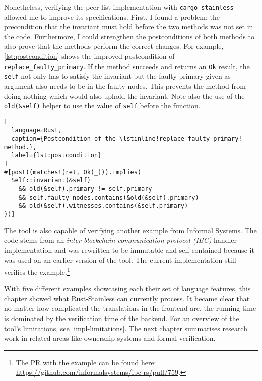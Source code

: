 Nonetheless, verifying the peer-list implementation with
\passthrough{\lstinline!cargo stainless!} allowed me to improve its
specifications. First, I found a problem: the precondition that the invariant
must hold before the two methods was not set in the code. Furthermore, I could
strengthen the postconditions of both methods to also prove that the methods
perform the correct changes. For example, \autoref{lst:postcondition} shows the
improved postcondition of \lstinline!replace_faulty_primary!. If the method
succeeds and returns an \lstinline!Ok! result, the \lstinline!self! not only has
to satisfy the invariant but the faulty primary given as argument also needs to
be in the faulty nodes. This prevents the method from doing nothing which would
also uphold the invariant. Note also the use of the \lstinline!old(&self)!
helper to use the value of \lstinline!self! before the function.

\begin{lstlisting}[
  language=Rust,
  caption={Postcondition of the \lstinline!replace_faulty_primary! method.},
  label={lst:postcondition}
]
#[post((matches!(ret, Ok(_))).implies(
  Self::invariant(&self)
    && old(&self).primary != self.primary
    && self.faulty_nodes.contains(&old(&self).primary)
    && old(&self).witnesses.contains(&self.primary)
))]
\end{lstlisting}

The tool is also capable of verifying another example from Informal Systems. The
code stems from an \emph{inter-blockchain communication protocol (IBC)} handler
implementation and was rewritten to be immutable and self-contained because it
was used on an earlier version of the tool. The current implementation still
verifies the example.\footnote{The PR with the example can be found here:
\url{https://github.com/informalsystems/ibc-rs/pull/759}.}

\hfill \break \noindent With five different examples showcasing each their set
of language features, this chapter showed what Rust-Stainless can currently
process. It became clear that no matter how complicated the translations in the
frontend are, the running time is dominated by the verification time of the
backend. For an overview of the tool's limitations, see
\autoref{impl-limitations}. The next chapter summarises research  work in
related areas like ownership systems and formal verification.
